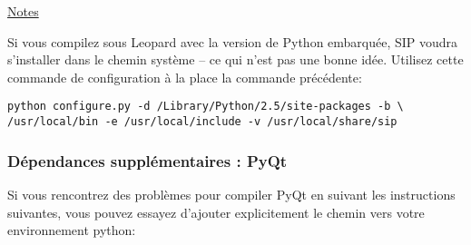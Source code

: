 \underline{Notes}

Si vous compilez sous Leopard avec la version de Python embarqu\'ee, SIP voudra s'installer dans le chemin syst\`eme -- ce qui n'est pas une bonne id\'ee. Utilisez cette commande de configuration \`a la place la commande pr\'ec\'edente:

\begin{verbatim}
python configure.py -d /Library/Python/2.5/site-packages -b \
/usr/local/bin -e /usr/local/include -v /usr/local/share/sip
\end{verbatim}

% 
% 
% 
% 
% 
% 
% 
% 
% 

\subsubsection{D\'ependances suppl\'ementaires : PyQt}
Si vous rencontrez des probl\`emes pour compiler PyQt en suivant les instructions suivantes, vous pouvez essayez d'ajouter explicitement le chemin vers votre environnement python:

